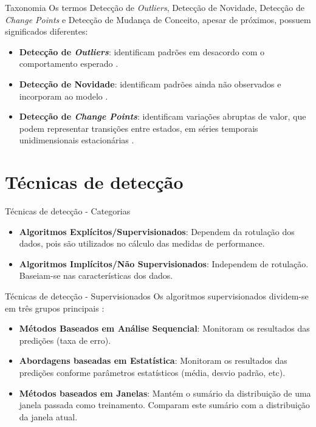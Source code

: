 \documentclass[10pt]{beamer}
\begin{document}
\begin{frame}{Taxonomia}
    Os termos Detecção de \textit{Outliers}, Detecção de Novidade, Detecção de \textit{Change Points} e Detecção de Mudança de Conceito, apesar de próximos, possuem significados diferentes:

    \begin{itemize}
        \item \textbf{Detecção de \textit{Outliers}}: identificam padrões em desacordo com o comportamento esperado \cite{Chandola:2009:ADS:1541880.1541882}.
        \item \textbf{Detecção de Novidade}: identificam padrões ainda não observados e incorporam ao modelo \cite{Chandola:2009:ADS:1541880.1541882}.
        \item \textbf{Detecção de \textit{Change Points}}: identificam variações abruptas de valor, que podem representar transições entre estados, em séries temporais unidimensionais estacionárias \cite{Aminikhanghahi:2017:SMT:3086013.3086037}.
    \end{itemize}
\end{frame}

\section{Técnicas de detecção}

\begin{frame}{Técnicas de detecção - Categorias}
    \begin{itemize}
        \item \textbf{Algoritmos Explícitos/Supervisionados}: Dependem da rotulação dos dados, pois são utilizados no cálculo das medidas de performance.
        \item \textbf{Algoritmos Implícitos/Não Supervisionados}: Independem de rotulação. Baseiam-se nas características dos dados. 
    \end{itemize}
\end{frame}

\begin{frame}{Técnicas de detecção - Supervisionados}
    Os algoritmos supervisionados dividem-se em três grupos principais \cite{Gama:2014:SCD:2597757.2523813}:

    \begin{itemize}
        \item \textbf{Métodos Baseados em Análise Sequencial}: Monitoram os resultados das predições (taxa de erro).
        \item \textbf{Abordagens baseadas em Estatística}: Monitoram os resultados das predições conforme parâmetros estatísticos (média, desvio padrão, etc).
        \item \textbf{Métodos baseados em Janelas}: Mantém o sumário da distribuição de uma janela passada como treinamento. Comparam este sumário com a distribuição da janela atual.
    \end{itemize}
\end{frame}
\end{document}
